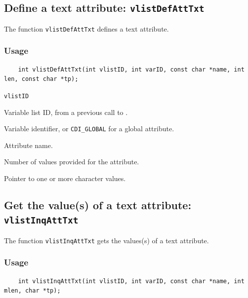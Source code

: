 \subsection{Define a text attribute: {\tt vlistDefAttTxt}}
\label{vlistDefAttTxt}

The function {\tt vlistDefAttTxt} defines a text attribute.

\subsubsection*{Usage}

\begin{verbatim}
    int vlistDefAttTxt(int vlistID, int varID, const char *name, int len, const char *tp);
\end{verbatim}

\hspace*{4mm}\begin{minipage}[]{15cm}
\begin{deflist}{\tt vlistID\ }
\item[{\tt vlistID}]
Variable list ID, from a previous call to {}.
\item[{\tt varID}]
Variable identifier, or {\tt CDI\_GLOBAL} for a global attribute.
\item[{\tt name}]
Attribute name.
\item[{\tt len}]
Number of values provided for the attribute.
\item[{\tt tp}]
Pointer to one or more character values.

\end{deflist}
\end{minipage}


\subsection{Get the value(s) of a text attribute: {\tt vlistInqAttTxt}}
\label{vlistInqAttTxt}

The function {\tt vlistInqAttTxt} gets the values(s) of a text attribute.

\subsubsection*{Usage}

\begin{verbatim}
    int vlistInqAttTxt(int vlistID, int varID, const char *name, int mlen, char *tp);
\end{verbatim}

